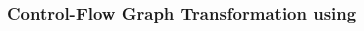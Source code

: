 \begin{frame}[t]
	\frametitle{Control-Flow Graph Transformation using \qvasr}
	\begin{columns}
		\begin{column}{0.4\textwidth}
			\resizebox{0.75\textwidth}{!}{}
		\end{column}
		\begin{column}{0.4\textwidth}
			\resizebox{0.8\textwidth}{!}{}
		\end{column}
	\end{columns}
\end{frame}